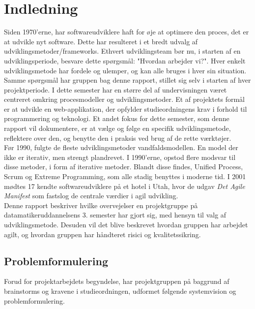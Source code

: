 \chapter{Indledning}\label{ch:indledning}
Siden 1970'erne, har softwareudviklere haft for øje at optimere den proces, det er at udvikle nyt software.
Dette har resulteret i et bredt udvalg af udviklingsmetoder/frameworks. Ethvert udviklingsteam bør nu, 
i starten af en udviklingsperiode, besvare dette spørgsmål: "Hvordan arbejder vi?". 
Hver enkelt udviklingsmetode har fordele og ulemper, og kan alle bruges i hver sin situation. \\

Samme spørgsmål har gruppen bag denne rapport, stillet sig selv i starten af hver projektperiode. 
I dette semester har en større del af undervisningen
været centreret omkring procesmodeller og udviklingsmetoder. 
Et af projektets formål er at udvikle en web-applikation, der opfylder studieordningens krav
i forhold til programmering og teknologi. Et andet fokus for dette semester, 
som denne rapport vil dokumentere, er at vælge og følge en specifik udviklingsmetode, 
reflektere over den, og benytte den i praksis ved brug af de rette værktøjer. \\

Før 1990, fulgte de fleste udviklingsmetoder vandfaldsmodellen. En model der ikke er iterativ, 
men strengt plandrevet. I 1990'erne, opstod flere modsvar til
disse metoder, i form af iterative metoder. Blandt disse findes, Unified Process, Scrum og Extreme Programming, 
som alle stadig benyttes i moderne tid.
I 2001 mødtes 17 kendte softwareudviklere på et hotel i Utah, 
hvor de udgav \textit{Det Agile Manifest} som fastslog de centrale værdier i agil udvikling. \\

Denne rapport beskriver hvilke overvejelser en projektgruppe på 
datamatikeruddannelsens 3. semester har gjort sig, med hensyn til valg af udviklingsmetode.
Desuden vil det blive beskrevet hvordan gruppen har arbejdet agilt, 
og hvordan gruppen har håndteret risici og kvalitetssikring.

\newpage
\section{Problemformulering}
Forud for projektarbejdets begyndelse, har projektgruppen på baggrund af brainstorms og kravene i
studieordningen, udformet følgende systemvision og problemformulering. \\


